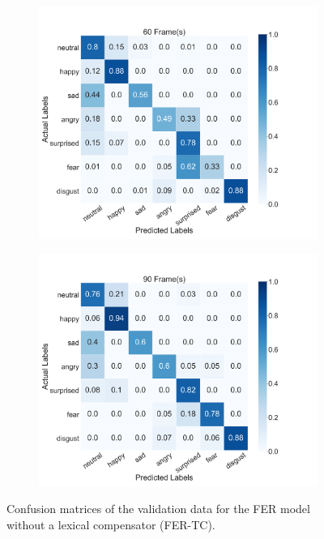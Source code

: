 \begin{figure}
\begin{subfigure}[b]{0.45\textwidth}
      \includegraphics[width=\textwidth]{res/conf_fer_60.png}
    \end{subfigure}
    \begin{subfigure}[b]{0.45\textwidth}
      \includegraphics[width=\textwidth]{res/conf_fer_90.png}
    \end{subfigure}
    \caption{Confusion matrices of the validation data for the FER model without a lexical compensator (FER-TC).}
    \label{fig:fer_conf}
\end{figure}

